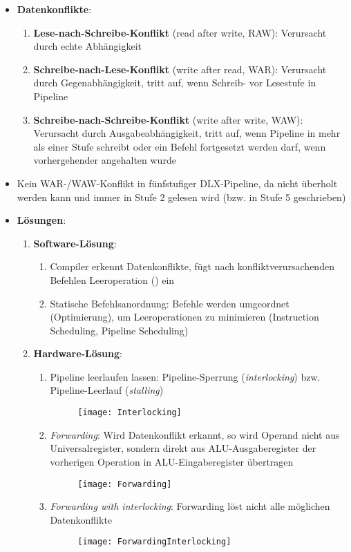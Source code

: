 \begin{itemize}
  \item \textbf{Datenkonflikte}:
  \begin{enumerate}
    \item \textbf{Lese-nach-Schreibe-Konflikt} (read after write, RAW): Verursacht durch echte Abhängigkeit
    \item \textbf{Schreibe-nach-Lese-Konflikt} (write after read, WAR): Verursacht durch Gegenabhängigkeit, tritt auf, wenn Schreib- vor Lesestufe in Pipeline
    \item \textbf{Schreibe-nach-Schreibe-Konflikt} (write after write, WAW): Verursacht durch Ausgabeabhängigkeit, tritt auf, wenn Pipeline in mehr als einer Stufe schreibt oder ein Befehl fortgesetzt werden darf, wenn vorhergehender angehalten wurde
  \end{enumerate}
  \item Kein WAR-/WAW-Konflikt in fünfstufiger DLX-Pipeline, da nicht überholt werden kann und immer in Stufe 2 gelesen wird (bzw. in Stufe 5 geschrieben)
  \item \textbf{Lösungen}:
  \begin{enumerate}
    \item \textbf{Software-Lösung}: 
    \begin{enumerate}
      \item Compiler erkennt Datenkonflikte, fügt nach konfliktverursachenden Befehlen Leeroperation () ein
      \item Statische Befehlsanordnung: Befehle werden umgeordnet (Optimierung), um Leeroperationen zu minimieren (Instruction Scheduling, Pipeline Scheduling)
    \end{enumerate}

    \item \textbf{Hardware-Lösung}:
    \begin{enumerate}
      \item Pipeline leerlaufen lassen: Pipeline-Sperrung (\emph{interlocking}) bzw. Pipeline-Leerlauf (\emph{stalling})
      \begin{figure}[H]\centering\label{Interlocking}\texttt{[image: Interlocking]}\end{figure}
      \item \emph{Forwarding}: Wird Datenkonflikt erkannt, so wird Operand nicht aus Universalregister, sondern direkt aus ALU-Ausgaberegister der vorherigen Operation in ALU-Eingaberegister übertragen
      \begin{figure}[H]\centering\label{Forwarding}\texttt{[image: Forwarding]}\end{figure}
      \item \emph{Forwarding with interlocking}: Forwarding löst nicht alle möglichen Datenkonflikte
      \begin{figure}[H]\centering\label{ForwardingInterlocking}\texttt{[image: ForwardingInterlocking]}\end{figure}
    \end{enumerate}
  \end{enumerate}
\end{itemize}

